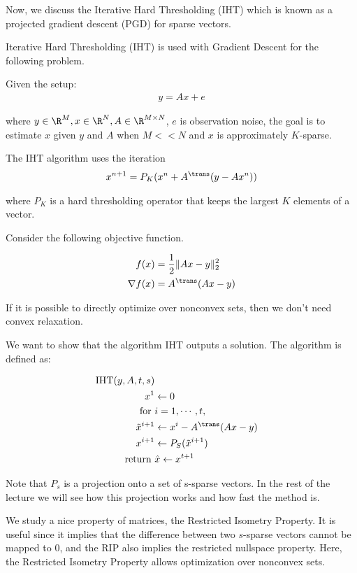 Now, we discuss the Iterative Hard Thresholding (IHT) which is known as a projected gradient descent (PGD) for sparse vectors.

Iterative Hard Thresholding (IHT) is used with Gradient Descent for the following problem.


Given the setup:
\begin{align}
y = A x + e 
\end{align}

where $y \in \R^M, x \in \R^N, A \in \R^{M \times N}$, $e$ is observation noise, the goal is to estimate $x$ given $y$ and $A$ when $M <<N$ and $x$ is approximately $K$-sparse.

The IHT algorithm uses the iteration
\begin{align}
x^{n+1} = P_K ( x^n + A^{\trans} (y - A x^n))
\end{align}

where $P_K$ is a hard thresholding operator that keeps the largest $K$ elements of a vector.

Consider the following objective function.

\begin{align}
f(x) &= \frac{1}{2} \| Ax - y \|_2^2 \\
\nabla f(x) &= A^{\trans}(Ax - y)
\end{align}

If it is possible to directly optimize over nonconvex sets, then we don't need convex relaxation.

We want to show that the algorithm IHT outputs a solution. The algorithm is defined as:

\begin{align*}
\text{IHT}(y, A, t, s) \\
x^1 &\leftarrow 0 \\
\text{ for } &i=1 ,\cdots, t, \\
\tilde{x}^{i+1} &\leftarrow x^i - A^{\trans} (Ax - y) \\
x^{i+1} &\leftarrow P_S( \tilde{x}^{i+1} ) \\
\text{ return }& \hat{x} \leftarrow x^{t+1}
\end{align*}

Note that $P_s$ is a projection onto a set of s-sparse vectors. In the rest of the lecture we will see how this projection works and how fast the method is.


We study a nice property of matrices, the Restricted Isometry Property. It is useful since it implies that the difference between two $s$-sparse vectors cannot be mapped to 0, and the RIP also implies the restricted nullspace property.
Here, the Restricted Isometry Property allows optimization over nonconvex sets.

